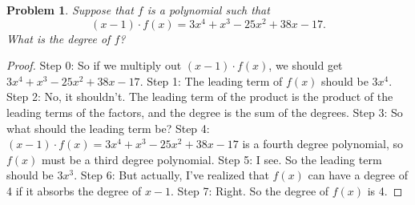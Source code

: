 \documentclass{article}
\newtheorem{theorem}{Problem}
\begin{document}
\begin{theorem}
Suppose that $f$ is a polynomial such that \[(x-1)\cdot f(x)=3x^4+x^3 - 25x^2 +38x -17.\] What is the degree of $f$?
\end{theorem}

\begin{proof}
Step 0: So if we multiply out $(x-1)\cdot f(x)$, we should get $3x^4+x^3-25x^2+38x-17$.
Step 1: The leading term of $f(x)$ should be $3x^4$.
Step 2: No, it shouldn't. The leading term of the product is the product of the leading terms of the factors, and the degree is the sum of the degrees.
Step 3: So what should the leading term be?
Step 4: $(x-1)\cdot f(x)=3x^4+x^3-25x^2+38x-17$ is a fourth degree polynomial, so $f(x)$ must be a third degree polynomial.
Step 5: I see. So the leading term should be $3x^3$.
Step 6: But actually, I've realized that $f(x)$ can have a degree of 4 if it absorbs the degree of $x-1$.
Step 7: Right. So the degree of $f(x)$ is 4.
\end{proof}
\end{document}
